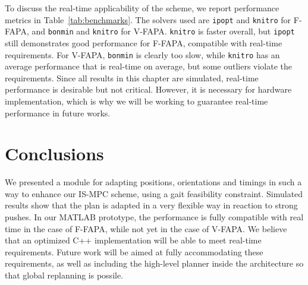 To discuss the real-time applicability of the scheme, we report performance metrics in Table~\ref{tab:benchmarks}. The solvers used are \texttt{ipopt} and \texttt{knitro} for F-FAPA, and \texttt{bonmin} and \texttt{knitro} for V-FAPA. \texttt{knitro} is faster overall, but \texttt{ipopt} still demonstrates good performance for F-FAPA, compatible with real-time requirements. For V-FAPA, \texttt{bonmin} is clearly too slow, while \texttt{knitro} has an average performance that is real-time on average, but some outliers violate the requirements. Since all results in this chapter are simulated, real-time performance is desirable but not critical. However, it is necessary for hardware implementation, which is why we will be working to guarantee real-time performance in future works.


\section{Conclusions}
\label{sec:FAPA:Conclusions}

We presented a module for adapting positions, orientations and timings in such a way to enhance our IS-MPC scheme, using a gait feasibility constraint. Simulated results show that the plan is adapted in a very flexible way in reaction to strong pushes. In our MATLAB prototype, the performance is fully compatible with real time in the case of F-FAPA, while not yet in the case of V-FAPA. We believe that an optimized C++ implementation will be able to meet real-time requirements. Future work will be aimed at fully accommodating these requirements, as well as including the high-level planner \cite{Cipriano2023RAS} inside the architecture so that global replanning is possile.
